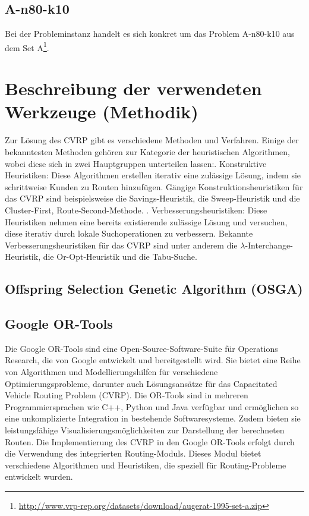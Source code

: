 \documentclass{IEEEtran}
\begin{document}
    \subsection{A-n80-k10}
    Bei der Probleminstanz handelt es sich konkret um das Problem A-n80-k10 aus dem Set A\footnote{\url{http://www.vrp-rep.org/datasets/download/augerat-1995-set-a.zip}}. 
    

\section{Beschreibung der verwendeten Werkzeuge (Methodik)}
    Zur Lösung des CVRP gibt es verschiedene Methoden und Verfahren. 
    Einige der bekanntesten Methoden gehören zur Kategorie der heuristischen
    Algorithmen, wobei diese sich in zwei Hauptgruppen
    unterteilen lassen:\newline{}. Konstruktive Heuristiken: Diese Algorithmen erstellen iterativ eine zulässige 
    Lösung, indem sie schrittweise Kunden zu Routen hinzufügen. Gängige 
    Konstruktionsheuristiken für das CVRP sind beispielsweise die Savings-Heuristik, 
    die Sweep-Heuristik und die Cluster-First, Route-Second-Methode. \newline{}. Verbesserungsheuristiken: Diese Heuristiken nehmen eine bereits existierende 
    zulässige Lösung und versuchen, diese iterativ durch lokale Suchoperationen zu 
    verbessern. Bekannte Verbesserungsheuristiken für das CVRP sind unter anderem die 
    $\lambda$-Interchange-Heuristik, die Or-Opt-Heuristik und die Tabu-Suche.
\subsection{Offspring Selection Genetic Algorithm (OSGA)}


\subsection{Google OR-Tools}
Die Google OR-Tools sind eine Open-Source-Software-Suite für Operations 
Research, die von Google entwickelt und bereitgestellt wird. Sie bietet eine Reihe von 
Algorithmen und Modellierungshilfen für verschiedene Optimierungsprobleme, darunter 
auch Lösungsansätze für das Capacitated Vehicle Routing Problem (CVRP). \newline\newline
Die OR-Tools sind in mehreren Programmiersprachen wie C++, Python und Java verfügbar und 
ermöglichen so eine unkomplizierte Integration in bestehende Softwaresysteme. Zudem bieten 
sie leistungsfähige Visualisierungsmöglichkeiten zur Darstellung der berechneten Routen.\newline\newline
Die Implementierung des CVRP in den Google OR-Tools erfolgt durch die Verwendung des 
integrierten Routing-Moduls. Dieses Modul bietet verschiedene Algorithmen und Heuristiken, 
die speziell für Routing-Probleme entwickelt wurden.
\end{document}
